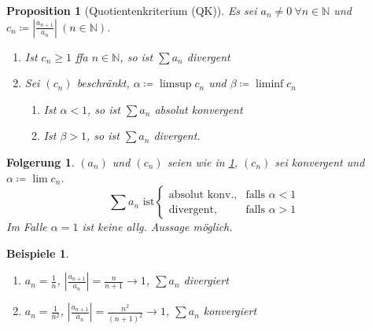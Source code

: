 \documentclass[titlepage,ngerman,a4paper,headsepline,DIV15,halfparskip*,14pt]{scrartcl}
\newcommand{\N}{\mathbb{N}}
\theoremstyle{dotless}
\newtheorem{prop}[satz]{Proposition}
\newtheorem{folg}[satz]{Folgerung}
\newtheorem*{beispiele}{Beispiele}
\begin{document}
\begin{prop}[Quotientenkriterium (QK)] \label{prop:3.7-Quotientenkriterium}
	Es sei $a_{n} \neq 0 ~\forall n \in \N$ und $c_{n} \coloneqq \left| \frac{a_{n+1}}{a_{n}} \right| ~(n \in \N)$.
	\begin{enumerate}
		\item Ist $c_{n} \geq 1$ ffa $n \in \N$, so ist $\sum a_{n}$ divergent
		\item Sei $(c_{n})$ beschränkt, $\alpha \coloneqq \limsup c_{n}$ und $\beta \coloneqq \liminf c_{n}$
			\begin{enumerate}
				\item Ist $\alpha < 1$, so ist $\sum a_{n}$ absolut konvergent
				\item Ist $\beta > 1$, so ist $\sum a_{n}$ divergent.
			\end{enumerate}
	\end{enumerate}
\end{prop}


\begin{folg} \label{folg:3.8}
	$(a_{n})$ und $(c_{n})$ seien wie in \ref{prop:3.7-Quotientenkriterium}, $(c_{n})$ sei konvergent und $\alpha \coloneqq \lim c_{n}$.
	$$ \sum a_{n} \text{ ist} \begin{cases} \text{absolut konv.}, & \text{falls } \alpha < 1 \\ \text{divergent}, & \text{falls } \alpha > 1 \end{cases} $$
	Im Falle $\alpha = 1$ ist keine allg. Aussage möglich.
\end{folg}


\begin{beispiele} ~\
	\begin{enumerate}
		\item $a_{n} = \frac{1}{n}$, $\left| \frac{a_{n+1}}{a_{n}} \right| = \frac{n}{n+1} \rightarrow 1$, $\sum a_{n}$ divergiert
		\item $a_{n} = \frac{1}{n^{2}}$, $ \left| \frac{a_{n+1}}{a_{n}} \right| = \frac{n^{2}}{(n+1)^{2}} \rightarrow 1$, $\sum a_{n}$ konvergiert 
	\end{enumerate}	
\end{beispiele}
\end{document}
